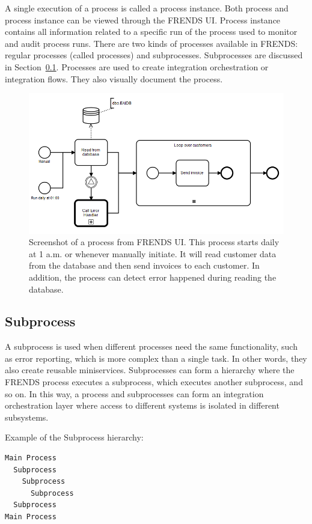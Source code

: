 \documentclass[english, 12pt, a4paper, sci, utf8, a-2b, online, obeyspaces]{aaltothesis}
\begin{document}
A single execution of a process is called a process instance. Both process and process instance can be viewed through the FRENDS UI. Process instance contains all information related to a specific run of the process used to monitor and audit process runs. There are two kinds of processes available in FRENDS: regular processes (called processes) and subprocesses. Subprocesses are discussed in Section~\ref{sec:subprocess}. Processes are used to create integration orchestration or integration flows. They also visually document the process.

\begin{figure}[htb]
  \centering
      \includegraphics[width=\textwidth]{pictures/frends/Simple_process2.png}
  \caption{Screenshot of a process from FRENDS UI. This process starts daily at 1 a.m. or whenever manually initiate. It will read customer data from the database and then send invoices to each customer. In addition, the process can detect error happened during reading the database.}
  \label{fig:Simple_process2}
\end{figure}

\subsection{Subprocess}
\label{sec:subprocess}
A subprocess is used when different processes need the same functionality, such as error reporting, which is more complex than a single task. In other words, they also create reusable miniservices. Subprocesses can form a hierarchy where the FRENDS process executes a subprocess, which executes another subprocess, and so on. In this way, a process and subprocesses can form an integration orchestration layer where access to different systems is isolated in different subsystems. 

Example of the Subprocess hierarchy:
\begin{verbatim}
Main Process
  Subprocess
    Subprocess
      Subprocess
  Subprocess
Main Process
\end{verbatim}
\end{document}
